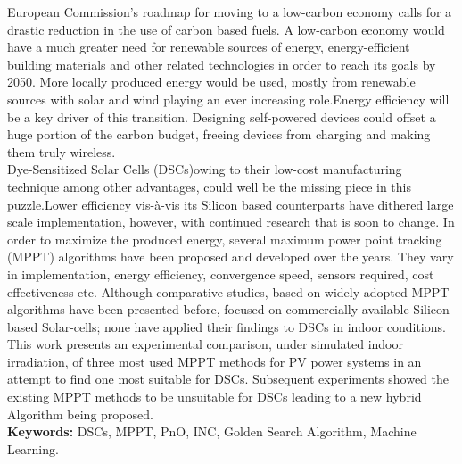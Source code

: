  European Commission's roadmap for moving to a low-carbon economy calls for a drastic reduction in the use of carbon based fuels. A low-carbon economy would have a much greater need for renewable sources of energy, energy-efficient building materials and other related technologies in order to reach its goals by 2050. More locally produced energy would be used, mostly from renewable sources with solar and wind playing an ever increasing role.Energy efficiency will be a key driver of this transition. Designing self-powered devices could offset a huge portion of the carbon budget, freeing devices from charging and making them truly wireless. \\
 
  Dye-Sensitized Solar Cells (DSCs)owing to their low-cost manufacturing technique among other advantages, could well be the missing piece in this puzzle.Lower efficiency vis-à-vis its Silicon based counterparts have dithered large scale implementation, however, with continued research that is soon to change. In order to  maximize the produced energy, several maximum power point tracking (MPPT) algorithms have been proposed and developed over the years. They vary in implementation, energy efficiency, convergence speed, sensors required, cost effectiveness etc. Although comparative studies, based on widely-adopted MPPT algorithms have been presented before, focused on commercially available Silicon based Solar-cells; none have applied their findings to DSCs in indoor conditions. This work presents an experimental comparison, under simulated indoor irradiation, of three most used MPPT methods for PV power systems in an attempt to find one most suitable for DSCs. Subsequent experiments showed the existing MPPT methods to be unsuitable for DSCs leading to a new hybrid Algorithm being proposed.\\       

{\bf Keywords:} DSCs, MPPT, PnO, INC, Golden Search Algorithm, Machine Learning. 
\acresetall
